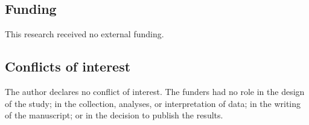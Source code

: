 \subsection*{Funding}
This research received no external funding.

\subsection*{Conflicts of interest}
The author declares no conflict of interest. The funders had no role in the design of the study; in the collection, analyses, or interpretation of data; in the writing of the manuscript; or in the decision to publish the results.

\information

